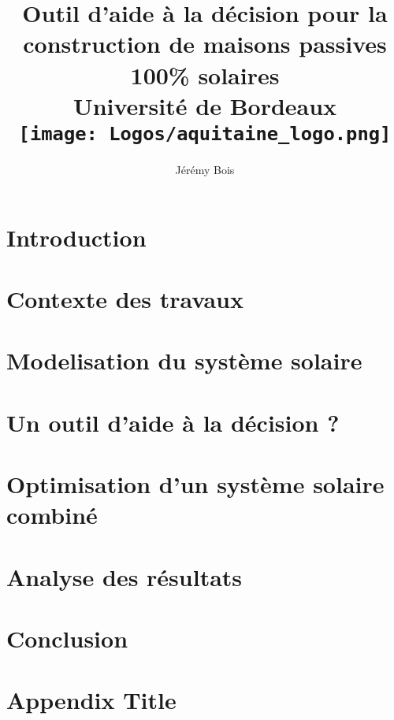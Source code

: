 \documentclass[12pt, twoside]{report}
\title{
    {Outil d’aide à la décision pour la construction de maisons passives 100\% solaires}\\
    {\large Université de Bordeaux}\\
    {\texttt{[image: Logos/aquitaine\_logo.png]}}
}
\author{Jérémy Bois}
\date{}
\begin{document}
\begin{titlepage}
    \maketitle
    \thispagestyle{empty}
\end{titlepage}





\tableofcontents
\listoffigures
\listoftables
\thispagestyle{empty}
\newpage




\chapter*{Introduction}


\chapter{Contexte des travaux}


\chapter{Modelisation du système solaire}


\chapter{Un outil d’aide à la décision ?}


\chapter{Optimisation d’un système solaire combiné}


\chapter{Analyse des résultats}


\chapter*{Conclusion}



\appendix
\chapter{Appendix Title}



\printbibliography
\end{document}
